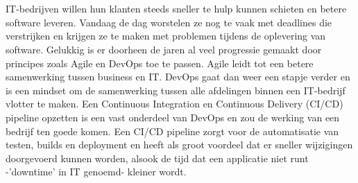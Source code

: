 
\chapter{}
\label{ch:inleiding}

IT-bedrijven willen hun klanten steeds sneller te hulp kunnen schieten en betere software leveren. Vandaag de dag worstelen ze nog te vaak met deadlines die verstrijken en krijgen ze te maken met problemen tijdens de oplevering van software. Gelukkig is er doorheen de jaren al veel progressie gemaakt door principes zoals Agile en DevOps toe te passen. Agile leidt tot een betere samenwerking tussen business en IT. DevOps gaat dan weer een stapje verder en is een mindset om de samenwerking tussen alle afdelingen binnen een IT-bedrijf vlotter te maken. 
Een Continuous Integration en Continuous Delivery (CI/CD) pipeline opzetten is een vast onderdeel van DevOps en zou de werking van een bedrijf ten goede komen. Een CI/CD pipeline zorgt voor de automatisatie van testen, builds en deployment en heeft als groot voordeel dat er sneller wijzigingen doorgevoerd kunnen worden, alsook de tijd dat een applicatie niet runt -'downtime' in IT genoemd- kleiner wordt.

